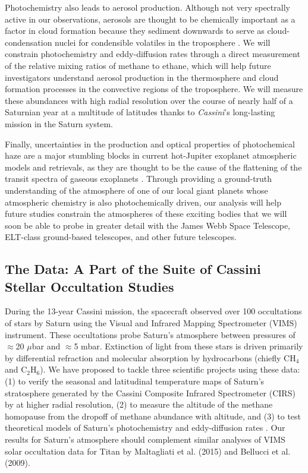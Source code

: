 \documentclass[twocolumn, twocolappendix, numberedappendix, linenumbers]{aastex631}
\newcommand{\Cas}{{\it Cassini}}
\begin{document}
Photochemistry also leads to aerosol production. Although not very spectrally
active in our observations, aerosols are thought to be chemically important as
a factor in cloud formation because they sediment downwards to serve as
cloud-condensation nuclei for condensible volatiles in the troposphere
\citep{Fletcher18}. We will constrain photochemistry and eddy-diffusion rates
through a direct measurement of the relative mixing ratios of methane to
ethane, which will help future investigators understand aerosol production in
the thermosphere and cloud formation processes in the convective regions of the
troposphere. We will measure these abundances with high radial resolution over
the course of nearly half of a Saturnian year at a multitude of latitudes
thanks to \Cas's long-lasting mission in the Saturn system.

Finally, uncertainties in the production and optical properties of
photochemical haze are a major stumbling blocks in current hot-Jupiter
exoplanet atmospheric models and retrievals, as they are thought to be the
cause of the flattening of the transit spectra of gaseous exoplanets
\citep{Fraine13}.  Through providing a ground-truth
understanding of the atmosphere of one of our local giant planets whose
atmospheric chemistry is also photochemically driven, our analysis will help
future studies constrain the atmospheres of these exciting bodies that we will
soon be able to probe in greater detail with the James Webb Space Telescope,
ELT-class ground-based telescopes, and other future telescopes.


\subsection{The Data: A Part of the Suite of Cassini Stellar Occultation Studies} \label{sec:intro-data}

During the 13-year Cassini mission, the spacecraft observed over 100
occultations of stars by Saturn using the Visual and Infrared Mapping
Spectrometer (VIMS) instrument. These occultations probe Saturn’s atmosphere
between pressures of $\approx$20 $\mu$bar and $\approx$5 mbar. Extinction of light from these stars
is driven primarily by differential refraction and molecular absorption by
hydrocarbons (chiefly CH$_4$ and C$_2$H$_6$). We have proposed to tackle three
scientific projects using these data: (1) to verify the seasonal and
latitudinal temperature maps of Saturn’s stratosphere generated by the Cassini
Composite Infrared Spectrometer (CIRS) by \citealp{Fletcher07} at higher
radial resolution, (2) to measure the altitude of the methane homopause from
the dropoff of methane abundance with altitude, and (3) to test theoretical
models of Saturn's photochemistry and eddy-diffusion rates \citep{Moses05}. Our
results for Saturn's atmosphere should complement similar analyses of VIMS
solar occultation data for Titan by Maltagliati et al.  (2015) and Bellucci et
al. (2009).
\end{document}
